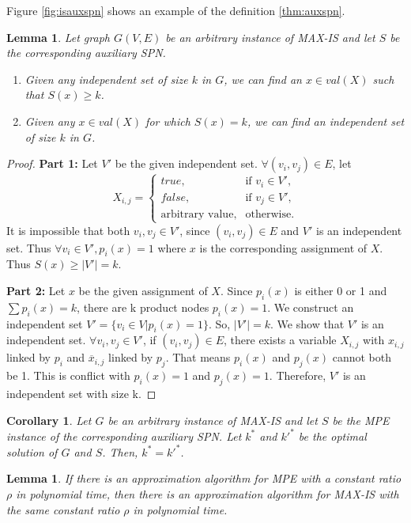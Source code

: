\documentclass{article}
\newtheorem{corollary}{Corollary}[theorem]
\newtheorem{lemma}[theorem]{Lemma}
\theoremstyle{remark}
\theoremstyle{definition}
\begin{document}
Figure \ref{fig:isauxspn} shows an example of the definition \ref{thm:auxspn}.

\begin{lemma}
Let graph $G(V, E)$ be an arbitrary instance of MAX-IS and let $S$ be the corresponding auxiliary SPN.
\begin{enumerate}
    \item Given any independent set of size $k$ in $G$, we can find an $x \in val(X)$ such that $S(x) \geq k$.
    \item Given any $x \in val(X)$ for which $S(x) = k$, we can find an  independent set of size $k$ in $G$.
\end{enumerate}
\end{lemma}
\begin{proof}
\textbf{Part 1:} Let $V'$ be the given independent set. $\forall (v_i, v_j) \in E$, let 
\[
X_{i, j} =
  \begin{cases}
    true, & \text{if $v_i \in V'$,}\\
    false, & \text{if $v_j \in V'$,}\\
    \text{arbitrary value}, & \text{otherwise.}
  \end{cases}    
\]
It is impossible that both $v_i, v_j \in V'$, since $(v_i, v_j) \in E$ and $V'$ is an independent set. Thus $\forall v_i \in V', p_i(x) = 1$ where $x$ is the corresponding assignment of $X$. Thus $S(x) \geq \left|V'\right| = k$.

\textbf{Part 2:} Let $x$ be the given assignment of $X$. Since $p_i(x)$ is either 0 or 1 and $\sum{p_i(x)}=k$, there are k product nodes $p_i(x) = 1$. We construct an independent set $V'=\{v_i \in V | p_i(x)=1\}$. So, $\left|V'\right| = k$. We show that $V'$ is an independent set. $\forall v_i, v_j \in V'$, if $(v_i, v_j) \in E$, there exists a variable $X_{i,j}$ with $x_{i,j}$ linked by $p_i$ and $\overline x_{i,j}$ linked by $p_j$. That means $p_i(x)$ and $p_j(x)$ cannot both be 1. This is conflict with $p_i(x)=1$ and $p_j(x)=1$. Therefore, $V'$ is an independent set with size k.
\end{proof}

\begin{corollary}
Let $G$ be an arbitrary instance of MAX-IS and let $S$ be the MPE instance of the corresponding auxiliary SPN. Let $k^\ast$ and $k'^\ast$ be the optimal solution of $G$ and $S$. Then, $k^\ast = k'^\ast$.
\end{corollary}

\begin{lemma}
If there is an approximation algorithm for MPE with a constant ratio $\rho$ in polynomial time, then there is an approximation algorithm for MAX-IS with the same constant ratio $\rho$ in polynomial time.
\end{lemma}
\end{document}
